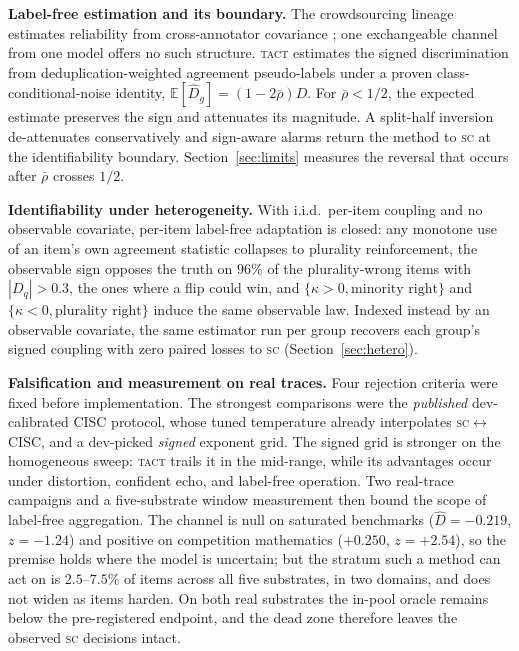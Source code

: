 \documentclass[conference]{IEEEtran}
\newcommand{\Dhat}{\widehat{D}}
\newcommand{\SC}{\textsc{sc}}
\newcommand{\TACT}{\textsc{tact}}
\begin{document}
\textbf{Label-free estimation and its boundary.} The crowdsourcing lineage
estimates reliability from cross-annotator covariance
\cite{dawid1979maximum,parisi2014ranking}; one exchangeable channel from one
model offers no such structure. \TACT{} estimates the signed discrimination
from deduplication-weighted agreement pseudo-labels under a proven
class-conditional-noise identity, $\mathbb{E}[\Dhat_g]=(1-2\bar\rho)D$. For
$\bar\rho<1/2$, the expected estimate preserves the sign and attenuates its
magnitude. A split-half inversion
de-attenuates conservatively and sign-aware alarms return the method to \SC{}
at the identifiability boundary. Section~\ref{sec:limits} measures the reversal
that occurs after $\bar\rho$ crosses $1/2$.

\textbf{Identifiability under heterogeneity.} With i.i.d.\
per-item coupling and no observable covariate, per-item label-free adaptation
is closed: any monotone use of an item's own agreement statistic collapses to
plurality reinforcement, the observable sign opposes the truth on $96\%$ of
the plurality-wrong items with $|D_q|>0.3$, the ones where a flip could win, and
$\{\kappa>0,\text{minority right}\}$ and $\{\kappa<0,\text{plurality right}\}$
induce the same observable law. Indexed instead by an observable covariate,
the same estimator run per group recovers each group's signed coupling with
zero paired losses to \SC{} (Section~\ref{sec:hetero}).

\textbf{Falsification and measurement on real traces.} Four rejection criteria
were fixed before implementation. The strongest comparisons were the
\emph{published} dev-calibrated CISC protocol, whose tuned temperature already
interpolates \SC$\leftrightarrow$CISC, and a dev-picked \emph{signed} exponent
grid. The signed grid is stronger on the homogeneous sweep: \TACT{} trails it
in the mid-range, while its advantages occur under distortion, confident echo,
and label-free operation. Two real-trace campaigns and a five-substrate window
measurement then bound the scope of label-free aggregation. The channel is null on saturated
benchmarks ($\Dhat=-0.219$, $z=-1.24$) and positive on competition
mathematics ($+0.250$, $z=+2.54$), so the premise holds where the model is
uncertain; but the stratum such a method can act on is $2.5$--$7.5\%$ of items
across all five substrates, in two domains, and does not widen as items
harden.
On both real substrates the in-pool oracle remains below the pre-registered
endpoint, and the dead zone therefore leaves the observed \SC{} decisions intact.
\end{document}
